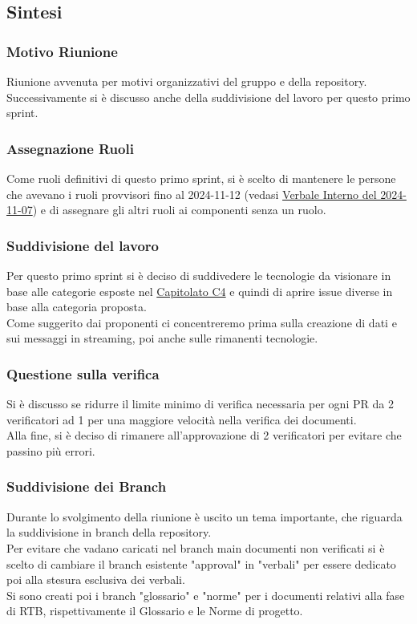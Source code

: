 \documentclass[10pt]{article}
\begin{document}
\subsection{Sintesi}
\subsubsection{Motivo Riunione}
Riunione avvenuta per motivi organizzativi del gruppo e della repository.\\ Successivamente si è discusso anche della suddivisione del lavoro per questo primo sprint.

\subsubsection{Assegnazione Ruoli}
Come ruoli definitivi di questo primo sprint, si è scelto di mantenere le persone che avevano i ruoli provvisori fino al 2024-11-12 (vedasi \href{https://sevenbitsswe.github.io/7BitsDocs/VerbaleInterno-2024-11-07.pdf}{Verbale Interno del 2024-11-07}) e di assegnare gli altri ruoli ai componenti senza un ruolo.

\subsubsection{Suddivisione del lavoro}
Per questo primo sprint si è deciso di suddivedere le tecnologie da visionare in base alle categorie esposte nel \href{https://www.math.unipd.it/~tullio/IS-1/2024/Progetto/C4.pdf}{Capitolato C4} e quindi di aprire issue diverse in base alla categoria proposta.\\ 
Come suggerito dai proponenti ci concentreremo prima sulla creazione di dati e sui messaggi in streaming, poi anche sulle rimanenti tecnologie.

\subsubsection{Questione sulla verifica}
Si è discusso se ridurre il limite minimo di verifica necessaria per ogni PR da 2 verificatori ad 1 per una maggiore velocità nella verifica dei documenti.\\
Alla fine, si è deciso di rimanere all'approvazione di 2 verificatori per evitare che passino più errori.

\subsubsection{Suddivisione dei Branch}
Durante lo svolgimento della riunione è uscito un tema importante, che riguarda la suddivisione in branch della repository.\\
Per evitare che vadano caricati nel branch main documenti non verificati si è scelto di cambiare il branch esistente "approval" in "verbali" per essere dedicato poi alla stesura esclusiva dei verbali.\\
Si sono creati poi i branch "glossario" e "norme" per i documenti relativi alla fase di RTB, rispettivamente il Glossario e le Norme di progetto.
\end{document}
